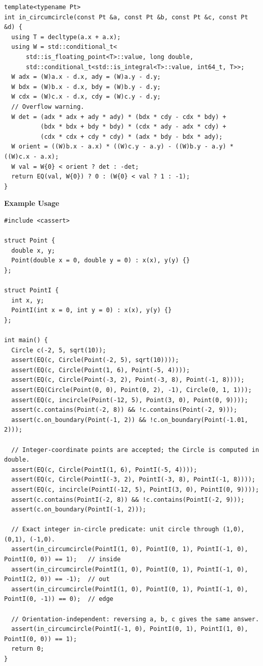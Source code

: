 \begin{lstlisting}[style=cpp]
template<typename Pt>
int in_circumcircle(const Pt &a, const Pt &b, const Pt &c, const Pt &d) {
  using T = decltype(a.x + a.x);
  using W = std::conditional_t<
      std::is_floating_point<T>::value, long double,
      std::conditional_t<std::is_integral<T>::value, int64_t, T>>;
  W adx = (W)a.x - d.x, ady = (W)a.y - d.y;
  W bdx = (W)b.x - d.x, bdy = (W)b.y - d.y;
  W cdx = (W)c.x - d.x, cdy = (W)c.y - d.y;
  // Overflow warning.
  W det = (adx * adx + ady * ady) * (bdx * cdy - cdx * bdy) +
          (bdx * bdx + bdy * bdy) * (cdx * ady - adx * cdy) +
          (cdx * cdx + cdy * cdy) * (adx * bdy - bdx * ady);
  W orient = ((W)b.x - a.x) * ((W)c.y - a.y) - ((W)b.y - a.y) * ((W)c.x - a.x);
  W val = W{0} < orient ? det : -det;
  return EQ(val, W{0}) ? 0 : (W{0} < val ? 1 : -1);
}
\end{lstlisting}
\textbf{Example Usage}\par
\begin{lstlisting}[style=cpp]
#include <cassert>

struct Point {
  double x, y;
  Point(double x = 0, double y = 0) : x(x), y(y) {}
};

struct PointI {
  int x, y;
  PointI(int x = 0, int y = 0) : x(x), y(y) {}
};

int main() {
  Circle c(-2, 5, sqrt(10));
  assert(EQ(c, Circle(Point(-2, 5), sqrt(10))));
  assert(EQ(c, Circle(Point(1, 6), Point(-5, 4))));
  assert(EQ(c, Circle(Point(-3, 2), Point(-3, 8), Point(-1, 8))));
  assert(EQ(Circle(Point(0, 0), Point(0, 2), -1), Circle(0, 1, 1)));
  assert(EQ(c, incircle(Point(-12, 5), Point(3, 0), Point(0, 9))));
  assert(c.contains(Point(-2, 8)) && !c.contains(Point(-2, 9)));
  assert(c.on_boundary(Point(-1, 2)) && !c.on_boundary(Point(-1.01, 2)));

  // Integer-coordinate points are accepted; the Circle is computed in double.
  assert(EQ(c, Circle(PointI(1, 6), PointI(-5, 4))));
  assert(EQ(c, Circle(PointI(-3, 2), PointI(-3, 8), PointI(-1, 8))));
  assert(EQ(c, incircle(PointI(-12, 5), PointI(3, 0), PointI(0, 9))));
  assert(c.contains(PointI(-2, 8)) && !c.contains(PointI(-2, 9)));
  assert(c.on_boundary(PointI(-1, 2)));

  // Exact integer in-circle predicate: unit circle through (1,0), (0,1), (-1,0).
  assert(in_circumcircle(PointI(1, 0), PointI(0, 1), PointI(-1, 0), PointI(0, 0)) == 1);   // inside
  assert(in_circumcircle(PointI(1, 0), PointI(0, 1), PointI(-1, 0), PointI(2, 0)) == -1);  // out
  assert(in_circumcircle(PointI(1, 0), PointI(0, 1), PointI(-1, 0), PointI(0, -1)) == 0);  // edge

  // Orientation-independent: reversing a, b, c gives the same answer.
  assert(in_circumcircle(PointI(-1, 0), PointI(0, 1), PointI(1, 0), PointI(0, 0)) == 1);
  return 0;
}
\end{lstlisting}
